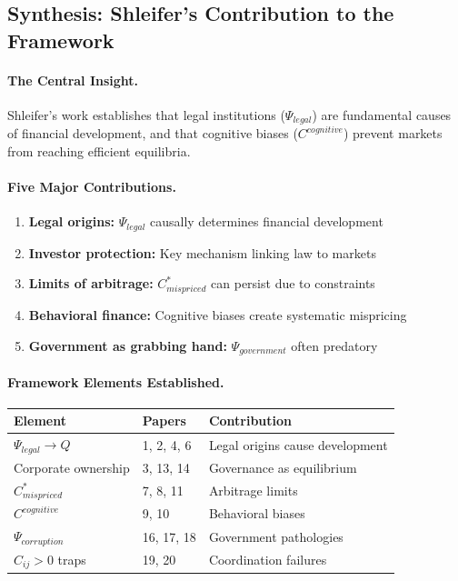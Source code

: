 \documentclass[12pt,a4paper]{article}
\begin{document}
\subsection{Synthesis: Shleifer's Contribution to the Framework}

\paragraph{The Central Insight.}
Shleifer's work establishes that legal institutions ($\Psi_{legal}$) are
fundamental causes of financial development, and that cognitive biases
($C^{cognitive}$) prevent markets from reaching efficient equilibria.

\paragraph{Five Major Contributions.}

\begin{enumerate}
  \item \textbf{Legal origins:} $\Psi_{legal}$ causally determines financial development
  \item \textbf{Investor protection:} Key mechanism linking law to markets
  \item \textbf{Limits of arbitrage:} $C^*_{mispriced}$ can persist due to constraints
  \item \textbf{Behavioral finance:} Cognitive biases create systematic mispricing
  \item \textbf{Government as grabbing hand:} $\Psi_{government}$ often predatory
\end{enumerate}

\paragraph{Framework Elements Established.}

\begin{center}
\renewcommand{\arraystretch}{1.2}
\small
\begin{tabular}{lll}
\hline
\textbf{Element} & \textbf{Papers} & \textbf{Contribution} \\
\hline
$\Psi_{legal} \to Q$ & 1, 2, 4, 6 & Legal origins cause development \\
Corporate ownership & 3, 13, 14 & Governance as equilibrium \\
$C^*_{mispriced}$ & 7, 8, 11 & Arbitrage limits \\
$C^{cognitive}$ & 9, 10 & Behavioral biases \\
$\Psi_{corruption}$ & 16, 17, 18 & Government pathologies \\
$C_{ij} > 0$ traps & 19, 20 & Coordination failures \\
\hline
\end{tabular}
\end{center}
\end{document}
